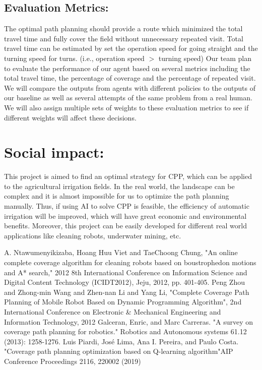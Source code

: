 \documentclass{article}
\begin{document}
\begin{normalsize}
            \subsection{Evaluation Metrics:}
            
                The optimal path planning should provide a route which minimized the total travel time and fully cover the field without unnecessary repeated visit.
                Total travel time can be estimated by set the operation speed for going straight and the turning speed for turns. (i.e., operation speed $>$ turning speed) Our team plan to evaluate the performance of our agent based on several metrics including the total travel time, the percentage of coverage and the percentage of repeated visit. We will compare the outputs from agents with different policies to the outputs of our baseline as well as several attempts of the same problem from a real human. We will also assign multiple sets of weights to these evaluation metrics to see if different weights will affect these decisions. 
                
            
        \section{Social impact:}
        
        This project is aimed to find an optimal strategy for CPP, which can be applied to the agricultural irrigation fields. In the real world, the landscape can be complex and it is almost impossible for us to optimize the path planning manually. Thus, if using AI to solve CPP is feasible, the efficiency of automatic irrigation will be improved, which will have great economic and environmental benefits.  Moreover, this project can be easily developed for different real world applications like cleaning robots, underwater mining, etc. 
        
    \end{normalsize}
  
  \newpage
    \begin{thebibliography}{00}
        A. Ntawumenyikizaba, Hoang Huu Viet and TaeChoong Chung, "An online complete coverage algorithm for cleaning robots based on boustrophedon motions and A* search," 2012 8th International Conference on Information Science and Digital Content Technology (ICIDT2012), Jeju, 2012, pp. 401-405.
        Peng Zhou and Zhong-min Wang and Zhen-nan Li and Yang Li, "Complete Coverage Path Planning of Mobile Robot Based on Dynamic Programming Algorithm", 2nd International Conference on Electronic \& Mechanical Engineering and Information Technology, 2012
        Galceran, Enric, and Marc Carreras. "A survey on coverage path planning for robotics." Robotics and Autonomous systems 61.12 (2013): 1258-1276.
        Luis Piardi, José Lima, Ana I. Pereira, and Paulo Costa. "Coverage path planning optimization based
        on Q-learning algorithm"AIP Conference Proceedings 2116, 220002 (2019)
        
    \end{thebibliography}
    
\end{document}
